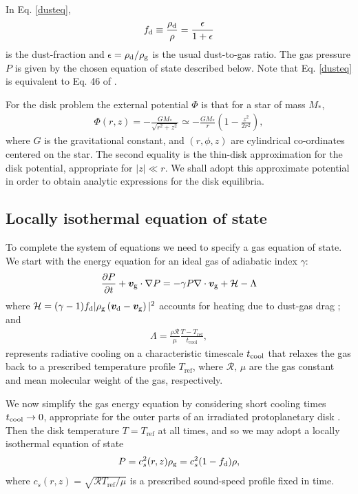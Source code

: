 In Eq. \ref{dusteq}, 
\begin{align}
  f_\mathrm{d} \equiv \frac{\rho_\mathrm{d}}{\rho}  = \frac{\epsilon}{1+\epsilon} 
\end{align}
is the dust-fraction and $\epsilon=\rho_\mathrm{d}/\rho_\mathrm{g}$ is the usual
dust-to-gas ratio. The gas pressure $P$ is given by the chosen 
equation of state described below. Note that Eq. \ref{dusteq} is
equivalent to Eq. 46 of \cite{jacquet11}. 

For the disk problem the external potential $\Phi$ is  
that for a star of mass $M_*$, 
\begin{align}\label{thin_disk_potential}
  \Phi(r,z) =-\frac{GM_*}{\sqrt{r^2 + z^2}}\simeq
  -\frac{GM_*}{r}\left(1 - \frac{z^2}{2r^2}\right), 
\end{align}
where $G$ is the gravitational constant, and $(r,\phi, z)$ are
cylindrical co-ordinates centered on the star. 
The second equality is the 
thin-disk approximation for the disk potential, appropriate for
$|z|\ll r$. We shall adopt this approximate potential in order to
obtain analytic expressions for the disk equilibria.  

\subsection{Locally isothermal equation of state}\label{loc_iso_eos}
To complete the system of equations we need to specify a gas equation
of state. We start with the 
energy equation for an ideal gas of adiabatic index $\gamma$: 
\begin{align}
  \frac{\partial P}{\partial t} + \bm{v}_\mathrm{g}\cdot\nabla P = - \gamma P
  \nabla\cdot \bm{v}_\mathrm{g}  + \mathcal{H} - \Lambda 
\end{align}
where $\mathcal{H} = 
(\gamma-1)f_\mathrm{d}|\rho_\mathrm{g}\left(\bm{v}_\mathrm{d}-\bm{v}_\mathrm{g}\right)|^2$
accounts for heating due to dust-gas drag \citep{laibe14}; and 
\begin{align}
  \Lambda = \frac{\rho \mathcal{R}}{\mu}\frac{T
  - T_\mathrm{ref}}{t_\mathrm{cool}}, \label{realenergy}
\end{align}
represents radiative cooling on a characteristic timescale
$t_\mathrm{cool}$ that relaxes the gas back to a prescribed temperature profile  
$T_\mathrm{ref}$, where $\mathcal{R},\, \mu$ are  the gas constant and
mean molecular weight of the gas, respectively.  

We now simplify the gas energy equation by considering short cooling 
times $t_\mathrm{cool}\to 0$, appropriate for the outer parts of an irradiated
protoplanetary disk \citep{chiang97,lin15}. Then the disk temperature
$T = T_\mathrm{ref}$ at all times, and so we may
adopt a locally isothermal equation of state 
\begin{align}\label{eos}
  P = c_s^2(r,z)\rho_\mathrm{g} = c_s^{2}(1 - f_\mathrm{d})\rho,   
\end{align}
where $c_s(r,z)= \sqrt{\mathcal{R}T_\mathrm{ref}/\mu}$ is a prescribed
sound-speed profile fixed in time.  

